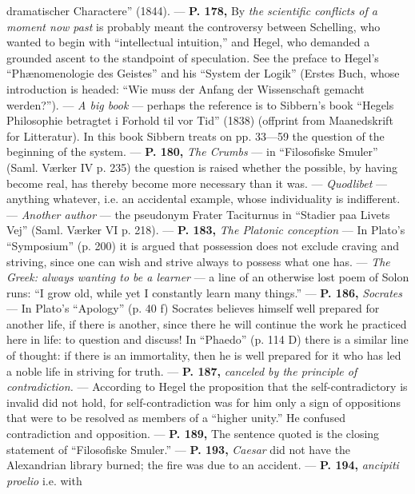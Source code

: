 \documentclass[12pt,a4paper,openany]{book}
\newcommand{\opage}[1]{\marginnote{\footnotesize\textit{[#1]}}}
\begin{document}
dramatischer Charactere'' (1844). --- \textbf{P. 178,} By \textit{the scientific conflicts of a moment
now past} is probably meant the controversy between Schelling,
who wanted to begin with ``intellectual intuition,'' and Hegel, who demanded a
grounded ascent to the standpoint of speculation. See the preface to Hegel's
``Phænomenologie des Geistes'' and his ``System der Logik'' (Erstes Buch,
whose introduction is headed: ``Wie muss der Anfang der Wissenschaft
gemacht werden?''). --- \textit{A big book} --- perhaps the reference is to Sibbern's
book ``Hegels Philosophie betragtet i Forhold til vor Tid'' (1838) (offprint
from Maanedskrift for Litteratur). In this book Sibbern treats on pp. 33—59
the question of the beginning of the system. --- \textbf{P. 180,} \textit{The Crumbs} --- in ``Filosofiske
Smuler'' (Saml. Værker IV p. 235) the question is raised whether
the possible, by having become real, has thereby become more necessary
than it was. --- \textit{Quodlibet} --- anything whatever, i.e. an accidental example, %
\setcounter{footnote}{0}%
\opage{305}whose individuality is indifferent. --- \textit{Another author} --- the pseudonym
Frater Taciturnus in ``Stadier paa Livets Vej'' (Saml. Værker VI p. 218). ---
\textbf{P. 183,} \textit{The Platonic conception} --- In Plato's ``Symposium'' (p. 200) it is argued
that possession does not exclude craving and striving, since one can wish
and strive always to possess what one has. --- \textit{The Greek: always wanting
to be a learner} --- a line of an otherwise lost poem of Solon runs:
``I grow old, while yet I constantly learn many things.'' --- \textbf{P. 186,}
\textit{Socrates} --- In Plato's ``Apology'' (p. 40 f) Socrates believes himself well prepared
for another life, if there is another, since there he will continue
the work he practiced here in life: to question and discuss! In ``Phaedo''
(p. 114 D) there is a similar line of thought: if there is an immortality, then
he is well prepared for it who has led a noble life in striving for truth.
--- \textbf{P. 187,} \textit{canceled by the principle of contradiction.} --- According to Hegel
the proposition that the self-contradictory is invalid did not hold, for self-contradiction
was for him only a sign of oppositions that were to be resolved
as members of a ``higher unity.'' He confused contradiction and opposition.
--- \textbf{P. 189,} The sentence quoted is the closing statement of ``Filosofiske
Smuler.'' --- \textbf{P. 193,} \textit{Caesar} did not have the Alexandrian library
burned; the fire was due to an accident. --- \textbf{P. 194,} \textit{ancipiti proelio} i.e. with
\end{document}
